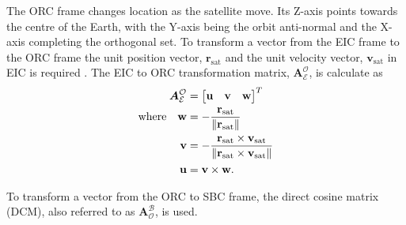 
The ORC frame changes location as the satellite move. Its Z-axis points towards the centre of the Earth, with the Y-axis being the orbit anti-normal and the X-axis completing the orthogonal set. To transform a vector from the EIC frame to the ORC frame the unit position vector, $\mathbf{r}_{\text{sat}}$ and the unit velocity vector, $\mathbf{v}_{\text{sat}}$ in EIC is required \cite{Chen_ground-target}. The EIC to ORC transformation matrix, $\boldsymbol{A}^{\mathcal{O}}_{\mathcal{E}}$, is calculate as
\begin{equation}
\label{Eq: ORC to EIC}
\begin{aligned}
	\boldsymbol{A}^{\mathcal{O}}_{\mathcal{E}} &= 
	\begin{bmatrix}
		\mathbf{u} & \mathbf{v} & \mathbf{w}\\
	\end{bmatrix}^T \\
\text{where} \quad
\mathbf{w} &= -\frac{\mathbf{r}_{\text{sat}}}{\left\lVert\mathbf{r}_{\text{sat}}\right\rVert} \\
\mathbf{v} &= -\frac{\mathbf{r}_{\text{sat}} \times \mathbf{v}_{\text{sat}}}{\left\lVert\mathbf{r}_{\text{sat}} \times \mathbf{v}_{\text{sat}}\right\rVert} \\
\mathbf{u} &= \mathbf{v} \times \mathbf{w}. \\
\end{aligned}
\end{equation}

To transform a vector from the ORC to SBC frame, the direct cosine matrix (DCM), also referred to as $\boldsymbol{A}^{\mathcal{B}}_{\mathcal{O}}$, is used.


